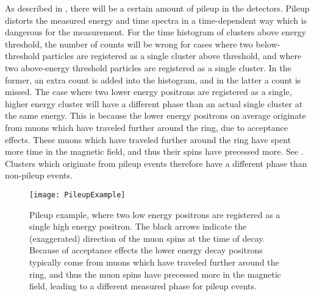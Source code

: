 As described in , there will be a certain amount of pileup in the detectors. Pileup distorts the measured energy and time spectra in a time-dependent way which is dangerous for the \wa measurement. For the time histogram of clusters above energy threshold, the number of counts will be wrong for cases where two below-threshold particles are registered as a single cluster above threshold, and where two above-energy threshold particles are registered as a single cluster. In the former, an extra count is added into the histogram, and in the latter a count is missed. The case where two lower energy positrons are registered as a single, higher energy cluster will have a different \gmtwo phase than an actual single cluster at the same energy. This is because the lower energy positrons on average originate from muons which have traveled further around the ring, due to acceptance effects. These muons which have traveled further around the ring have spent more time in the magnetic field, and thus their spins have precessed more. See . Clusters which originate from pileup events therefore have a different \gmtwo phase than non-pileup events. 

\begin{figure}
    \centering
    \texttt{[image: PileupExample]}
    \caption[Pileup example]{Pileup example, where two low energy positrons are registered as a single high energy positron. The black arrows indicate the (exaggerated) direction of the muon spins at the time of decay. Because of acceptance effects the lower energy decay positrons typically come from muons which have traveled further around the ring, and thus the muon spins have precessed more in the magnetic field, leading to a different measured \gmtwo phase for pileup events.}
    \label{fig:PileupExample}
\end{figure}

